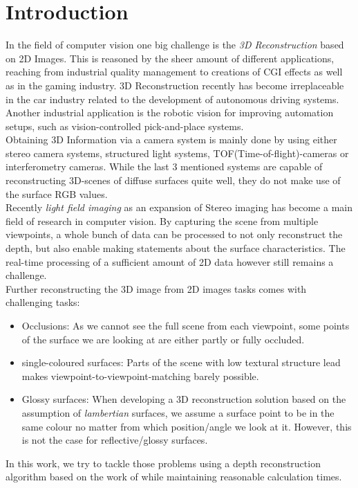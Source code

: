 \documentclass  [
  paper    = a4,
  BCOR     = 10mm,
  twoside,
  fontsize = 12pt,
  fleqn,
  toc      = bibnumbered,
  toc      = listofnumbered,
  numbers  = noendperiod,
  headings = normal,
  listof   = leveldown,
  version  = 3.03
]                                       {scrreprt}
\begin{document}
  

  \tableofcontents


\chapter{Introduction}
In the field of computer vision one big challenge is the \textit{3D Reconstruction} based on 2D Images. This is reasoned by the sheer amount of different applications, reaching from industrial quality management to creations of CGI effects as well as in the gaming industry. 3D Reconstruction recently has become irreplaceable in the car industry related to the development of autonomous driving systems. Another industrial application is the robotic vision for improving automation setups, such as vision-controlled pick-and-place systems.\\

Obtaining 3D Information via a camera system is mainly done by using either stereo camera systems, structured light systems, TOF(Time-of-flight)-cameras or interferometry cameras. While the last 3 mentioned systems are capable of reconstructing 3D-scenes of diffuse surfaces quite well, they do not make use of the surface RGB values.\\
Recently \textit{light field imaging} as an expansion of Stereo imaging has become a main field of research in computer vision. By capturing the scene from multiple viewpoints, a whole bunch of data can be processed to not only reconstruct the depth, but also enable making statements about the surface characteristics. The real-time processing of a sufficient amount of 2D data however still remains a challenge. \\
Further reconstructing the 3D image from 2D images tasks comes with challenging tasks:
\begin{itemize}
	\item Occlusions: As we cannot see the full scene from each viewpoint, some points of the surface we are looking at are either partly or fully occluded.
	\item single-coloured surfaces: Parts of the scene with low textural structure lead makes viewpoint-to-viewpoint-matching barely possible.
	\item Glossy surfaces: When developing a 3D reconstruction solution based on the assumption of \textit{lambertian} surfaces, we assume a surface point to be in the same colour no matter from which position/angle we look at it. However,  this is not the case for reflective/glossy surfaces.
\end{itemize}
In this work, we try to tackle those problems using a depth reconstruction algorithm based on the work of \cite{wanner2014orientation} while maintaining reasonable calculation times.
\end{document}
